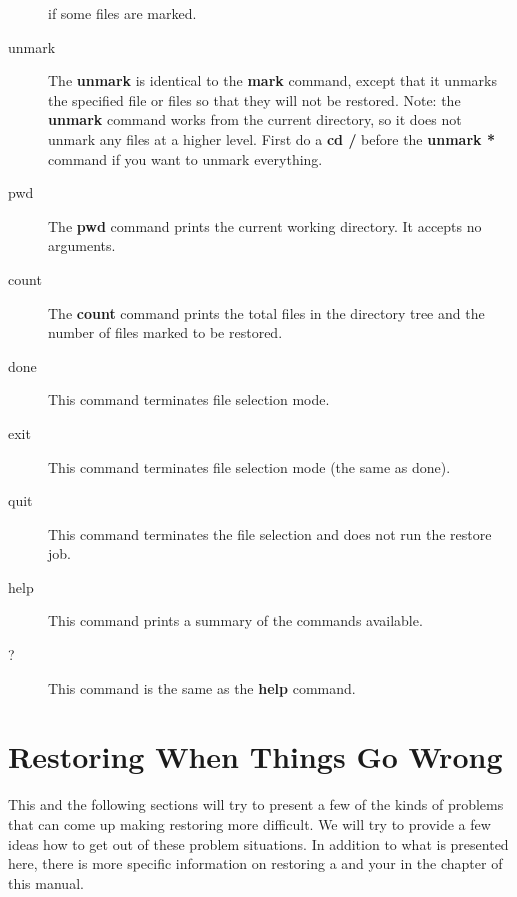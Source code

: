 \begin{description}
   if some files are marked.  

\item [unmark]
   The {\bf unmark} is identical to the {\bf mark}  command, except that it
   unmarks the specified file or files so that  they will not be restored. Note:
   the {\bf unmark} command works from  the current directory, so it does not
   unmark any files at a higher  level. First do a {\bf cd /} before the {\bf
   unmark *} command if  you want to unmark everything.  

\item [pwd]
   The {\bf pwd} command prints the current working  directory. It accepts no
   arguments.  

\item [count]
   The {\bf count} command prints the total files in the  directory tree and the
   number of files marked to be restored.  

\item [done]
   This command terminates file selection mode.  

\item [exit]
   This command terminates file selection mode (the same as  done).  

\item [quit]
   This command terminates the file selection and does  not run the restore
job. 


\item [help]
   This command prints a summary of the commands available.  

\item [?]
   This command is the same as the {\bf help} command.  
\end{description}

\label{database_restore}
\section{Restoring When Things Go Wrong}

This and the following sections will try to present a few of the kinds of
problems that can come up making restoring more difficult. We will try to
provide a few ideas how to get out of these problem situations.
In addition to what is presented here, there is more specific information
on restoring a  and your
 in the  chapter of this manual.

